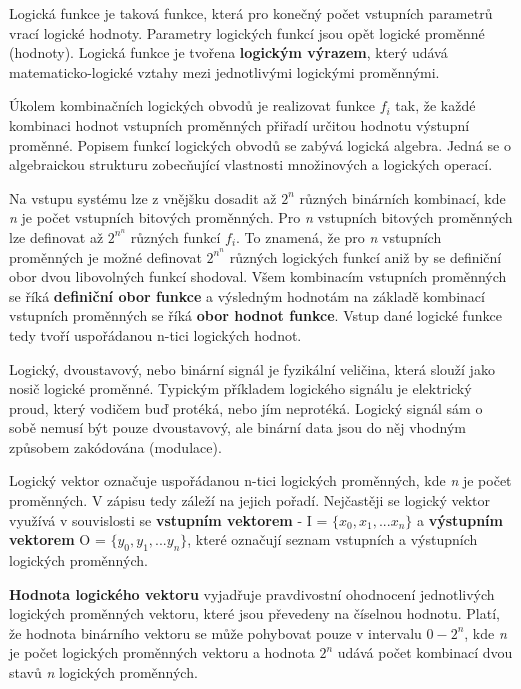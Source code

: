 
Logická funkce je taková funkce, která pro konečný počet vstupních parametrů vrací logické hodnoty. Parametry logických funkcí jsou opět logické proměnné (hodnoty). Logická funkce je tvořena {\bf logickým výrazem}, který udává matematicko-logické vztahy mezi jednotlivými logickými proměnnými.

Úkolem kombinačních logických obvodů je realizovat funkce $f_i$ tak, že každé kombinaci hodnot vstupních proměnných přiřadí určitou hodnotu výstupní proměnné. Popisem funkcí logických obvodů se zabývá logická algebra. Jedná se o algebraickou strukturu zobecňující vlastnosti množinových a logických operací.

Na vstupu systému lze z vnějšku dosadit až $2^n$ různých binárních kombinací, kde {\it n} je počet vstupních bitových proměnných. Pro {\it n} vstupních bitových proměnných lze definovat až $2^{n^n}$ různých funkcí $f_i$. To znamená, že pro {\it n} vstupních proměnných je možné definovat $2^{n^n}$ různých logických funkcí aniž by se definiční obor dvou libovolných funkcí shodoval.
Všem kombinacím vstupních proměnných se říká {\bf definiční obor funkce} a výsledným hodnotám na základě kombinací vstupních proměnných se říká {\bf obor hodnot funkce}. Vstup dané logické funkce tedy tvoří uspořádanou n-tici logických hodnot.


Logický, dvoustavový, nebo binární signál je fyzikální veličina, která slouží jako nosič logické proměnné. Typickým příkladem logického signálu je elektrický proud, který vodičem buď protéká, nebo jím neprotéká. Logický signál sám o sobě nemusí být pouze dvoustavový, ale binární data jsou do něj vhodným způsobem zakódována (modulace).


Logický vektor označuje uspořádanou n-tici logických proměnných, kde {\it n} je počet proměnných. V zápisu tedy záleží na jejich pořadí. Nejčastěji se logický vektor využívá v souvislosti se {\bf vstupním vektorem} - I = $\{x_0, x_1, ... x_n\}$ a {\bf výstupním vektorem} O = $\{y_0, y_1, ... y_n\}$, které označují seznam vstupních a výstupních logických proměnných.

{\bf Hodnota logického vektoru} vyjadřuje pravdivostní ohodnocení jednotlivých logických proměnných vektoru, které jsou převedeny na číselnou hodnotu. Platí, že hodnota binárního vektoru se může pohybovat pouze v intervalu $0 - 2^n$, kde {\it n} je počet logických proměnných vektoru a hodnota $2^n$ udává počet kombinací dvou stavů {\it n} logických proměnných. 

